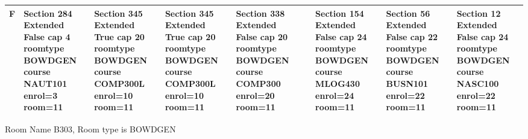 \documentclass{article} \usepackage[margin=0.5in]{geometry}
\newcommand{\textgr}[1]{\cellcolor{gray!40}\textbf{#1}}
\begin{document}
\begin{tabular}{|c|z|z|z|z|z|z|z|z|}
\hline
\textgr{F} &  Section 284 Extended False cap 4 roomtype BOWDGEN course NAUT101 enrol=3 room=11 & Section 345 Extended True cap 20 roomtype BOWDGEN course COMP300L enrol=10 room=11 & Section 345 Extended True cap 20 roomtype BOWDGEN course COMP300L enrol=10 room=11 & Section 338 Extended False cap 20 roomtype BOWDGEN course COMP300 enrol=20 room=11 &  & Section 154 Extended False cap 24 roomtype BOWDGEN course MLOG430 enrol=24 room=11 & Section 56 Extended False cap 22 roomtype BOWDGEN course BUSN101 enrol=22 room=11 & Section 12 Extended False cap 24 roomtype BOWDGEN course NASC100 enrol=22 room=11 \\[65pt]
\hline
\end{tabular}

	
Room Name B303, Room type is BOWDGEN 
\newpage
	
\end{document}
